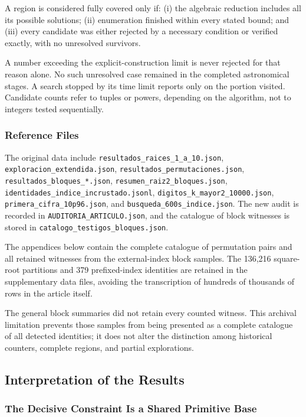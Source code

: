 \documentclass[11pt,a4paper]{article}
\begin{document}
A region is considered fully covered only if: (i) the algebraic reduction includes all its possible solutions; (ii) enumeration finished within every stated bound; and (iii) every candidate was either rejected by a necessary condition or verified exactly, with no unresolved survivors.

A number exceeding the explicit-construction limit is never rejected for that reason alone. No such unresolved case remained in the completed astronomical stages. A search stopped by its time limit reports only on the portion visited. Candidate counts refer to tuples or powers, depending on the algorithm, not to integers tested sequentially.

\subsubsection{Reference Files}

The original data include \nolinkurl{resultados_raices_1_a_10.json}, \nolinkurl{exploracion_extendida.json}, \nolinkurl{resultados_permutaciones.json}, \nolinkurl{resultados_bloques_*.json}, \nolinkurl{resumen_raiz2_bloques.json}, \nolinkurl{identidades_indice_incrustado.jsonl}, \nolinkurl{digitos_k_mayor2_10000.json}, \nolinkurl{primera_cifra_10p96.json}, and \nolinkurl{busqueda_600s_indice.json}. The new audit is recorded in \nolinkurl{AUDITORIA_ARTICULO.json}, and the catalogue of block witnesses is stored in \nolinkurl{catalogo_testigos_bloques.json}.

The appendices below contain the complete catalogue of permutation pairs and all retained witnesses from the external-index block samples. The 136,216 square-root partitions and 379 prefixed-index identities are retained in the supplementary data files, avoiding the transcription of hundreds of thousands of rows in the article itself.

The general block summaries did not retain every counted witness. This archival limitation prevents those samples from being presented as a complete catalogue of all detected identities; it does not alter the distinction among historical counters, complete regions, and partial explorations.

\subsection{Interpretation of the Results}

\subsubsection{The Decisive Constraint Is a Shared Primitive Base}
\end{document}
